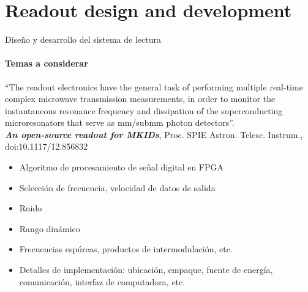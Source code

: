 \documentclass[ignorenonframetext,12pt]{beamer}
\begin{document}
\section{Readout design and development}
\begin{frame}{Diseño y desarrollo del sistema de lectura}
				\framesubtitle{Temas a considerar}

					{\color[rgb]{0.8,.4,.5} ``The readout electronics have the general task
					of performing multiple real-time complex microwave transmission
					measurements, in order to monitor the instantaneous resonance frequency
					and dissipation of the superconducting microresonators that serve as
					mm/submm photon detectors''.}\\

				\tiny{\emph{\textbf{An open-source readout for MKIDs}}, Proc. SPIE Astron.
				Telesc.  Instrum., doi:10.1117/12.856832}

				\normalsize{\begin{itemize}
								\item Algoritmo de procesamiento de señal digital en FPGA
								\item Selección de frecuencia, velocidad de datos de salida
								\item Ruido
								\item Rango dinámico
								\item Frecuencias espúreas, productos de intermodulación, etc.
								\item Detalles de implementación: ubicación, empaque, fuente de
												energía, comunicación, interfaz de computadora, etc.
				\end{itemize}}
\end{frame}
\end{document}

